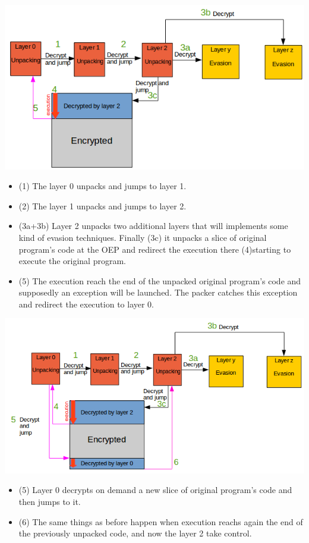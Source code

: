 \includegraphics[width=1\textwidth]{pictures/packer_type_5-1.png}

\begin{itemize}
\item (1) The layer 0 unpacks and jumps to layer 1.
\item (2) The layer 1 unpacks and jumps to layer 2.
\item (3a+3b) Layer 2 unpacks two additional layers that will implements some kind of evasion techniques. Finally (3c) it unpacks a slice of original program's code at the OEP and redirect the execution there (4)starting to execute the original program.
\item (5) The execution reach the end of the unpacked original program's code and supposedly an exception will be launched. The packer catches this exception and redirect the execution to layer 0.
\end{itemize}

\includegraphics[width=1.1\textwidth]{pictures/packer_type_5-2.png}

\begin{itemize}
\item (5) Layer 0 decrypts on demand a new slice of original program's code and then jumps to it.
\item (6) The same things as before happen when execution reachs again the end of the previously unpacked code, and now the layer 2 take control.
\end{itemize}

